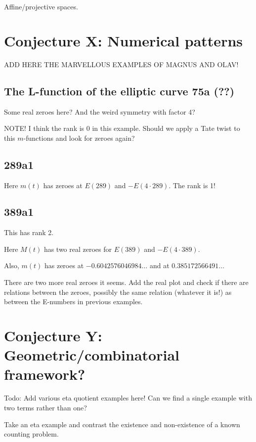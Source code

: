 \documentclass[paper=a4, fontsize=11pt]{scrartcl} %
\numberwithin{equation}{section} %
\numberwithin{figure}{section} %
\numberwithin{table}{section} %
\begin{document}
Affine/projective spaces.



\section{Conjecture X: Numerical patterns}

ADD HERE THE MARVELLOUS EXAMPLES OF MAGNUS AND OLAV!

\subsection{The L-function of the elliptic curve 75a (??)}

Some real zeroes here? And the weird symmetry with factor 4?

NOTE! I think the rank is 0 in this example. Should we apply a Tate twist to this $m$-functions and look for zeroes again?

\subsection{289a1}

Here $m(t)$ has zeroes at $E(289)$ and $-E(4 \cdot 289)$. The rank is 1!

\subsection{389a1}

This has rank 2.

Here $M(t)$ has two real zeroes for $E(389)$ and $-E(4 \cdot 389)$.

Also, $m(t)$ has zeroes at $-0.6042576046984\ldots$ and at $0.385172566491\ldots$

There are two more real zeroes it seems. Add the real plot and check if there are relations between the zeroes, possibly the same relation (whatever it is!) as between the E-numbers in previous examples.

\section{Conjecture Y: Geometric/combinatorial framework?}

Todo: Add various eta quotient examples here! Can we find a single example with two terms rather than one?

Take an eta example and contrast the existence and non-existence of a known counting problem.
\end{document}
